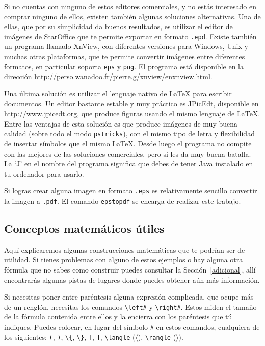 Si no cuentas con ninguno de estos editores comerciales, y no est\'as interesado en comprar ninguno 
de ellos, existen tambi\'en algunas soluciones alternativas. Una de ellas, que por su simplicidad 
da buenos resultados, es utilizar el editor de im\'agenes de StarOffice que te permite
exportar en formato \texttt{.epd}. Existe tambi\'en un programa llamado XnView, con
diferentes versiones para Windows, Unix y muchas otras plataformas, que te permite
convertir im\'agenes entre diferentes formatos, en particular soporta \texttt{eps}
y \texttt{png}. El programa est\'a disponible en la direcci\'on
\url{http://perso.wanadoo.fr/pierre.g/xnview/enxnview.html}.

Una  \'ultima soluci\'on es utilizar el lenguaje nativo
de \LaTeX{} para escribir documentos. Un editor bastante estable y muy pr\'actico
es JPicEdt, disponible en \url{http://www.jpicedt.org}, que produce figuras usando
el mismo lenguaje de \LaTeX{}. Entre las ventajas de esta soluci\'on es que produce
im\'agenes de muy buena calidad (sobre todo el modo \texttt{pstricks}), con el
mismo tipo de letra y flexibilidad de insertar s\'imbolos que el mismo \LaTeX{}.
Desde luego el programa no compite con las mejores de las soluciones comerciales,
pero si les da muy buena batalla. La `J' en el nombre del programa significa que debes
de tener Java instalado en tu ordenador para usarlo.

Si logras crear alguna imagen en formato \texttt{.eps} es
relativamente sencillo convertir la imagen a \texttt{.pdf}. El comando \texttt{epstopdf}
se encarga de realizar este trabajo.


\subsection{Conceptos matem\'aticos \'utiles}\label{masmate}

Aqu\'i explicaremos algunas construcciones matem\'aticas que te podr\'ian ser de utilidad.
Si tienes problemas con alguno de estos ejemplos o hay alguna otra f\'ormula que no
sabes como construir puedes consultar la Secci\'on~\ref{adicional}, all\'i encontrar\'as
algunas pistas de lugares donde puedes obtener a\'un m\'as informaci\'on.

Si  necesitas poner entre par\'entesis alguna
expresi\'on complicada, que ocupe m\'as de un rengl\'on, necesitas los comandos
\verb|\left#| y \verb|\right#|. Estos miden el tama\~no de la f\'ormula contenida
entre ellos y la encierra con los par\'entesis que t\'u indiques. Puedes colocar,
en lugar del s\'imbolo \verb|#| en estos comandos, cualquiera de los
siguientes: \verb|(|, \verb|)|, \verb|\{|, \verb|\}|, \verb|[|, \verb|]|, \verb|\langle|
($\langle$), \verb|\rangle| ($\rangle$).


